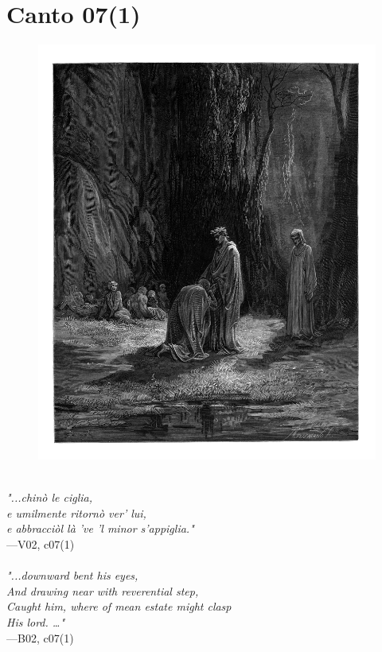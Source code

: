 \documentclass[../Dore_vision.tex]{subfiles}
\begin{document}
\newpage

\section{Canto 07(1)}

\begin{figure}[ht]
\centering
\includegraphics[height=\figsize]{illustrations/book_2/V02, c07(1).jpg}
\end{figure}

\begin{center}
\begin{minipage}{0.8\linewidth}
\textit{\\
"...chin\`o le ciglia,\\e umilmente ritorn\`o ver’ lui,\\e abbracci\`ol là ’ve ’l minor s’appiglia."} \\
—V02, c07(1) \\~\\
\textit{"...downward bent his eyes,\\And drawing near with reverential step,\\Caught him, where of mean estate might clasp\\His lord. …"} \\
—B02, c07(1)
\end{minipage}
\end{center}
\end{document}
